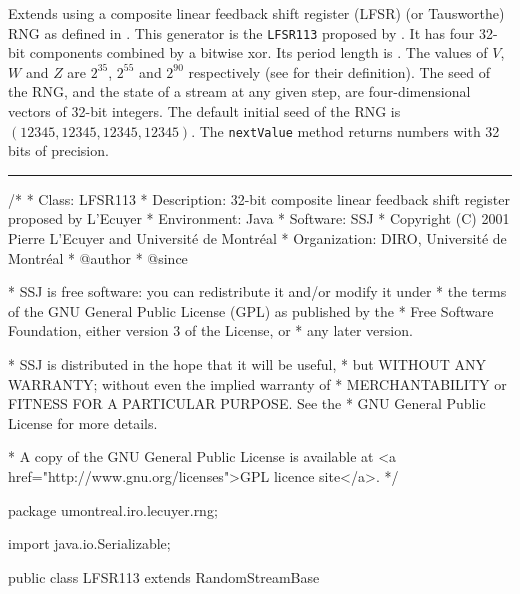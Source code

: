
Extends  using a composite linear feedback
shift register (LFSR) (or Tausworthe) RNG as defined in
\cite{rLEC96a,rTEZ91b}.
This generator is the \texttt{LFSR113} proposed by \cite{rLEC99a}.
It has four 32-bit components combined by a bitwise xor.
Its period length is 
. The values of $V$, $W$ and $Z$ are $2^{35}$,
$2^{55}$ and $2^{90}$ respectively (see  for their
definition). The seed of the RNG, and the state of a stream at any given
step, are four-dimensional vectors of 32-bit integers.
The default initial seed of the RNG is $(12345, 12345, 12345, 12345)$.
The \texttt{nextValue} method returns numbers with 32 bits of precision.


\bigskip\hrule

\begin{code}
\begin{hide}
/*
 * Class:        LFSR113
 * Description:  32-bit composite linear feedback shift register proposed by L'Ecuyer
 * Environment:  Java
 * Software:     SSJ 
 * Copyright (C) 2001  Pierre L'Ecuyer and Université de Montréal
 * Organization: DIRO, Université de Montréal
 * @author       
 * @since

 * SSJ is free software: you can redistribute it and/or modify it under
 * the terms of the GNU General Public License (GPL) as published by the
 * Free Software Foundation, either version 3 of the License, or
 * any later version.

 * SSJ is distributed in the hope that it will be useful,
 * but WITHOUT ANY WARRANTY; without even the implied warranty of
 * MERCHANTABILITY or FITNESS FOR A PARTICULAR PURPOSE.  See the
 * GNU General Public License for more details.

 * A copy of the GNU General Public License is available at
   <a href="http://www.gnu.org/licenses">GPL licence site</a>.
 */
\end{hide}
package umontreal.iro.lecuyer.rng; \begin{hide}

import java.io.Serializable;
\end{hide}

public class LFSR113 extends RandomStreamBase \begin{hide} {

   private static final long serialVersionUID = 70510L;
   // La date de modification a l'envers, lire 10/05/2007

   // generator constant: make sure that double values 0 and 1 never occur
   private static final double NORM = 1.0 / 0x100000001L;   // 2^32 + 1


   // state variables:
   private int z0;
   private int z1;
   private int z2;
   private int z3;

   //stream and substream variables :
   private int[] stream;
   private int[] substream;
   private static int[] curr_stream = {12345, 12345, 12345, 12345};

 \end{hide}
\end{code}

